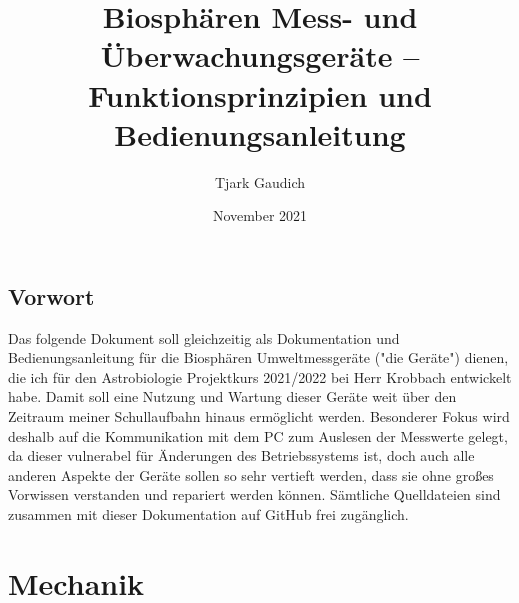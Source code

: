 \documentclass[12pt, a4paper, oneside]{report}
\title{\textbf{Biosphären Mess- und Überwachungsgeräte -- Funktionsprinzipien und Bedienungsanleitung}}
\author{Tjark Gaudich}
\date{November 2021}
\begin{document}

\begin{titlepage}
\maketitle
\thispagestyle{empty}
\end{titlepage}

\section{Vorwort}
Das folgende Dokument soll gleichzeitig als Dokumentation und Bedienungsanleitung für die Biosphären Umweltmessgeräte ("die Geräte") dienen, die ich für den Astrobiologie Projektkurs 2021/2022 bei Herr Krobbach entwickelt habe. Damit soll eine Nutzung und Wartung dieser Geräte weit über den Zeitraum meiner Schullaufbahn hinaus ermöglicht werden. Besonderer Fokus wird deshalb auf die Kommunikation mit dem PC zum Auslesen der Messwerte gelegt, da dieser vulnerabel für Änderungen des Betriebssystems ist, doch auch alle anderen Aspekte der Geräte sollen so sehr vertieft werden, dass sie ohne großes Vorwissen verstanden und repariert werden können. Sämtliche Quelldateien sind zusammen mit dieser Dokumentation auf 
GitHub\cite{Github} frei zugänglich.
\tableofcontents
\listoffigures

\chapter{Mechanik}
\end{document}
